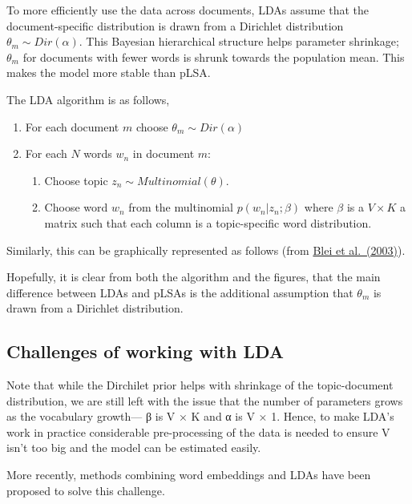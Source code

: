 \documentclass[
]{book}
\begin{document}
To more efficiently use the data across documents, LDAs assume that the document-specific distribution is drawn from a Dirichlet distribution \(\theta_m \sim Dir(\alpha)\). This Bayesian hierarchical structure helps parameter shrinkage; \(\theta_m\) for documents with fewer words is shrunk towards the population mean. This makes the model more stable than pLSA.

The LDA algorithm is as follows,

\begin{enumerate}
\def\labelenumi{\arabic{enumi}.}
\item
  For each document \(m\) choose \(\theta_m \sim Dir(\alpha)\)
\item
  For each \(N\) words \(w_n\) in document \(m\):

  \begin{enumerate}
  \def\labelenumii{\arabic{enumii}.}
  \item
    Choose topic \(z_{n} \sim Multinomial(\theta)\).
  \item
    Choose word \(w_n\) from the multinomial \(p(w_n|z_n;\beta)\) where \(\beta\) is a \(V\times K\) a matrix such that each column is a topic-specific word distribution.
  \end{enumerate}
\end{enumerate}

Similarly, this can be graphically represented as follows (from \href{https://www.jmlr.org/papers/volume3/blei03a/blei03a.pdf}{Blei et al.~(2003)}).

Hopefully, it is clear from both the algorithm and the figures, that the main difference between LDAs and pLSAs is the additional assumption that \(\theta_m\) is drawn from a Dirichlet distribution.

\hypertarget{challenges-of-working-with-lda}{%
\subsection{Challenges of working with LDA}\label{challenges-of-working-with-lda}}

Note that while the Dirchilet prior helps with shrinkage of the topic-document distribution, we are still left with the issue that the number of parameters grows as the vocabulary growth--- β is V × K and α is V × 1. Hence, to make LDA's work in practice considerable pre-processing of the data is needed to ensure V isn't too big and the model can be estimated easily.

More recently, methods combining word embeddings and LDAs have been proposed to solve this challenge.
\end{document}
